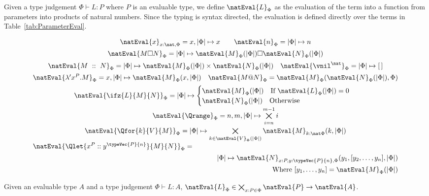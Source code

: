 Given a type judgement $\Phi \vdash L : P$ where $P$ is an evaluable type,
we define $\natEval{L}_\Phi$ as the evaluation of the term into a function from parameters into products of natural numbers.
Since the typing is syntax directed, the evaluation is defined directly over the terms in Table~\ref{tab:ParameterEval}.
\begin{table}\small
    \[
    \begin{array}{c}
        \natEval{x}_{x:\nat, \Phi} = x, |\Phi| \mapsto x \qquad \natEval{n}_\Phi = |\Phi| \mapsto n \\[5pt]
        \natEval{M \square N}_\Phi = |\Phi| \mapsto \natEval{M}_\Phi(|\Phi|) \square \natEval{N}_\Phi(|\Phi|)\\[5pt]
        \natEval{M\ ::\ N}_{\Phi} = |\Phi| \mapsto \natEval{M}_\Phi(|\Phi|) \times \natEval{N}_\Phi(|\Phi|) \quad \natEval{\vnil^\nat}_{\Phi} = |\Phi| \mapsto [\,]\\[5pt]
        \natEval{\lambda' x^P.M}_\Phi = x,|\Phi| \mapsto \natEval{M}_\Phi(x,|\Phi|)\quad \natEval{M @ N}_\Phi = \natEval{M}_\Phi(\natEval{N}_\Phi(|\Phi|), \Phi)\\[5pt]
        \natEval{\ifz{L}{M}{N}}_\Phi = |\Phi| \mapsto 
        \begin{cases}
            \natEval{M}_\Phi(|\Phi|)\quad \text{If } \natEval{L}_\Phi(|\Phi|) = 0 \\
            \natEval{N}_\Phi(|\Phi|)\quad \text{Otherwise}
        \end{cases}\\[10pt]
        \natEval{\Qrange}_\Phi = n,m,|\Phi| \mapsto \bigtimes\limits_{i=n}^{m-1} i \\[10pt]
        \natEval{\Qfor{k}{V}{M}}_\Phi = |\Phi| \mapsto \bigtimes\limits_{k\in \natEval{V}_\Phi(|\Phi|)} \natEval{M}_{k:\nat\Phi}(k, |\Phi|)\\[10pt]
        \multicolumn{1}{l}{\natEval{\Qlet{x^P :: y^{\typeVec{P}{n}}}{M}{N}}_\Phi = }\\[5pt]
        \multicolumn{1}{r}{|\Phi|\mapsto \natEval{N}_{x:P, y:\typeVec{P}{n}, \Phi}(y_1,[y_2,\dots,y_n],|\Phi|)}\\[5pt]
        \multicolumn{1}{r}{\text{Where } [y_1,\dots,y_n] = \natEval{M}_\Phi(|\Phi|)}
    \end{array}
    \]
    \caption{Parameter evaluation}
    \label{tab:ParameterEval}
\end{table}

\begin{lemma}%
    \label{lem:eval-type}
    Given an evaluable type $A$ and a type judgement $\Phi \vdash L : A$,
    $\natEval{L}_\Phi \in \bigtimes_{x:P \in \Phi} \natEval{P} \to \natEval{A}$.
\end{lemma}

